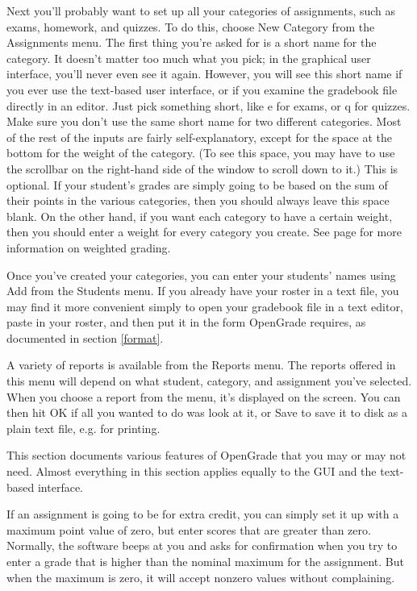 \documentclass{opengrade_doc}
\begin{document}
Next you'll probably want to set up all your categories of
assignments, such as exams, homework, and quizzes. To do this,
choose New Category from the Assignments menu. The first thing
you're asked for is a short name for the category.
It doesn't matter too much what you pick; in the graphical
user interface, you'll never even see it again. However, you will
see this short name if you ever use the text-based user interface,
or if you examine the gradebook file directly in an editor.
Just pick something short, like e for exams, or q for quizzes.
Make sure you don't use the same short name for two different
categories. Most of the rest of the inputs are fairly self-explanatory,
except for the space at the bottom for the weight of the category.
(To see this space, you may have to use the scrollbar on the right-hand
side of the window to scroll down to it.)
This is optional. If your student's grades are simply going to be
based on the sum of their points in the various categories, then
you should always leave this space blank. On the other hand, if you
want each category to have a certain weight, then you should enter
a weight for every category you create. See page
\pageref{weightedgrading} for more information on weighted grading.

Once you've created your categories, you can enter your students'
names using Add from the Students menu. If you already have your
roster in a text file, you may find it more convenient simply to
open your gradebook file in a text editor, paste in your roster,
and then put it in the form OpenGrade requires, as documented in
section \ref{format}.

A variety of reports is available from the Reports menu.
The reports offered in this menu will depend on what student,
category, and assignment you've selected. When you choose
a report from the menu, it's displayed on the screen. You can
then hit OK if all you wanted to do was look at it, or Save
to save it to disk as a plain text file, e.g. for printing.

\label{goodies}
This section documents various features of OpenGrade that you may
or may not need. Almost everything in this section applies equally to the
GUI and the text-based interface.


If an assignment is going to be for extra credit, you can simply
set it up with a maximum point value of zero, but enter scores that
are greater than zero. Normally, the software beeps at you and asks
for confirmation when you try to enter a grade that is higher than the
nominal maximum for the assignment. But when the maximum is zero,
it will accept nonzero values without complaining. 
\end{document}
